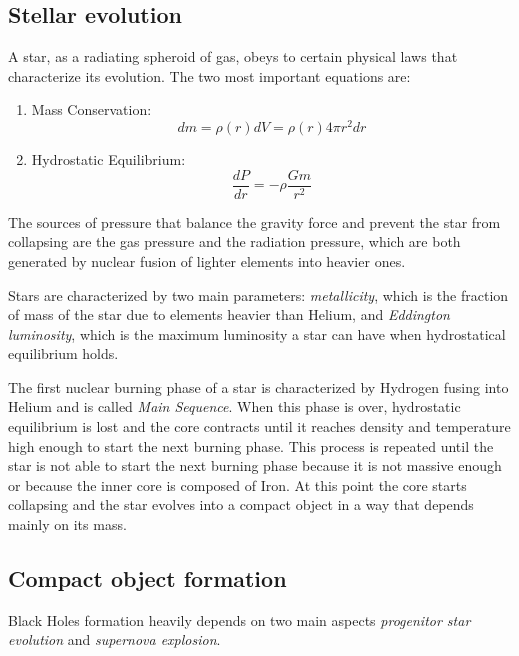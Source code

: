\documentclass[prb,twocolumn,9pt]{revtex4-1}
\begin{document}
\subsection{Stellar evolution}
A star, as a radiating spheroid of gas, obeys to certain physical laws that characterize its evolution. The two most important equations are:
\begin{enumerate}
   \item Mass Conservation: 
   \begin{equation}
      dm = \rho(r) dV = \rho(r) 4 \pi r^{2} dr
   \end{equation}
   \item Hydrostatic Equilibrium: 
   \begin{equation}
      \frac{dP}{dr} = -\rho \frac{G m}{r^{2}}
   \end{equation}
\end{enumerate}
The sources of pressure that balance the gravity force and prevent the star from collapsing are the gas pressure and the radiation pressure, which are both generated by nuclear fusion of lighter elements into heavier ones. 

Stars are characterized by two main parameters:
\textit{metallicity}, which is the fraction of mass of the star due to elements heavier than Helium, and \textit{Eddington luminosity}, which is the maximum luminosity a star can have when hydrostatical equilibrium holds.

The first nuclear burning phase of a star is characterized by Hydrogen fusing into Helium and is called \textit{Main Sequence}.
When this phase is over, hydrostatic equilibrium is lost and the core contracts until it reaches density and temperature high enough to start the next burning phase. 
This process is repeated until the star is not able to start the next burning phase because it is not massive enough or because the inner core is composed of Iron. 
At this point the core starts collapsing and the star evolves into a compact object in a way that depends mainly on its mass.

\subsection{Compact object formation}

Black Holes formation heavily depends on two main aspects \textit{progenitor star evolution} and \textit{supernova explosion}.
\end{document}
